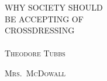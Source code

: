 \newcommand*{\titleGP}{\begingroup %
\centering %
\vspace*{\baselineskip} %


{\LARGE WHY SOCIETY SHOULD\\ BE ACCEPTING OF \\[0.3\baselineskip] CROSSDRESSING}\\~\\[0.2\baselineskip] %


\scshape %
Theodore Tubbs
\vspace*{2\baselineskip} %


\vfill %

\scshape Mrs.~McDowall\\[0.3\baselineskip] %

\endgroup}


\thispagestyle{empty} %

\titleGP{} %
